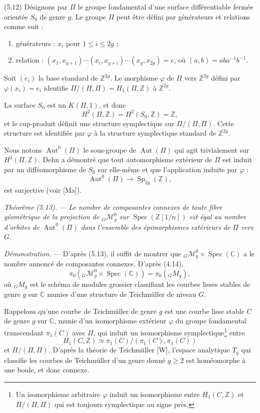 \documentclass[10pt]{article}
\newcommand{\Spec}{\operatorname{Spec}}
\newcommand{\Aut}{\operatorname{Aut}}
\begin{document}
\medskip
\noindent(5.12) Désignons par $\Pi$ le groupe fondamental d'une surface différentiable fermée orientée $S_0$ de genre $g$. Le groupe $\Pi$ peut être défini par générateurs et relations comme suit :
\begin{enumerate}[label=(\roman*)]
\item générateurs : $x_i$ pour $1\leq i\leq 2g$ ;
\item relation : $(x_1,x_{g+1})\cdots(x_i,x_{g+i})\cdots(x_g,x_{2g})=e$, où $(a,b)=aba^{-1}b^{-1}$.
\end{enumerate}
Soit $(e_i)$ la base standard de $\mathbb Z^{2g}$. Le morphisme $\varphi$ de $\Pi$ vers $\mathbb Z^{2g}$ défini par $\varphi(x_i)=e_i$ identifie $\Pi/(\Pi,\Pi)=H_1(\Pi,\mathbb Z)$ à $\mathbb Z^{2g}$.

La surface $S_0$ est un $K(\Pi,1)$, et donc
\[
H^2(\Pi,\mathbb Z)=H^2(S_0,\mathbb Z)=\mathbb Z,
\]
et le cup-produit définit une structure symplectique sur $\Pi/(\Pi,\Pi)$. Cette structure est identifiée par $\varphi$ à la structure symplectique standard de $\mathbb Z^{2g}$.

Nous notons $\Aut^0(\Pi)$ le sous-groupe de $\Aut(\Pi)$ qui agit trivialement sur $H^2(\Pi,\mathbb Z)$. Dehn a démontré que tout automorphisme extérieur de $\Pi$ est induit par un difféomorphisme de $S_0$ sur elle-même et que l'application induite par $\varphi$ :
\[
\Aut^0(\Pi)\longrightarrow \operatorname{Sp}_{2g}(\mathbb Z),
\]
est surjective (voir [Ma]).

\medskip
\noindent\emph{Théorème (5.13).} --- \emph{Le nombre de composantes connexes de toute fibre géométrique de la projection de ${}_G\mathcal M_g^0$ sur $\Spec(\mathbb Z[1/n])$ est égal au nombre d'orbites de $\Aut^0(\Pi)$ dans l'ensemble des épimorphismes extérieurs de $\Pi$ vers $G$.}

\noindent\emph{Démonstration.} --- D'après (5.13), il suffit de montrer que ${}_G\mathcal M_g^0\times\Spec(\mathbb C)$ a le nombre annoncé de composantes connexes. D'après (4.14),
\[
\pi_0({}_G\mathcal M_g^0\times\Spec(\mathbb C))=\pi_0({}_GM_g),
\]
où ${}_GM_g$ est le schéma de modules grossier classifiant les courbes lisses stables de genre $g$ sur $\mathbb C$ munies d'une structure de Teichmüller de niveau $G$.

Rappelons qu'une courbe de Teichmüller de genre $g$ est une courbe lisse stable $C$ de genre $g$ sur $\mathbb C$, munie d'un isomorphisme extérieur $\varphi$ du groupe fondamental transcendant $\pi_1(C)$ avec $\Pi$, qui induit un isomorphisme symplectique\footnote{Un isomorphisme arbitraire $\varphi$ induit un isomorphisme entre $H_1(C,\mathbb Z)$ et $\Pi/(\Pi,\Pi)$ qui est toujours symplectique au signe près.} entre
\[
H_1(C,\mathbb Z)\simeq \pi_1(C)/(\pi_1(C),\pi_1(C))
\]
et $\Pi/(\Pi,\Pi)$. D'après la théorie de Teichmüller [W], l'espace analytique $T_g$ qui classifie les courbes de Teichmüller d'un genre donné $g\geq2$ est homéomorphe à une boule, et donc connexe.
\end{document}
